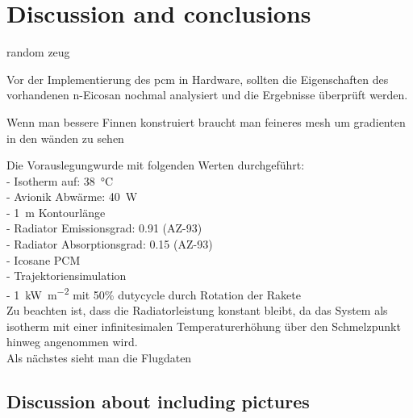 \chapter{Discussion and conclusions}
\label{chap:conclusion}
random zeug

Vor der Implementierung des \ac{pcm} in Hardware, sollten die Eigenschaften des vorhandenen n-Eicosan nochmal analysiert und die Ergebnisse überprüft werden.

Wenn man bessere Finnen konstruiert braucht man feineres mesh um gradienten in den wänden zu sehen


Die Vorauslegungwurde mit folgenden Werten durchgeführt:\\
- Isotherm auf: \SI{38}{\celsius}\\
- Avionik Abwärme: \SI{40}{W}\\
- \SI{1}{m} Kontourlänge\\
- Radiator Emissionsgrad: \SI{0,91}{} (AZ-93)\\
- Radiator Absorptionsgrad: \SI{0,15}{} (AZ-93)\\
- Icosane PCM\\
- Trajektoriensimulation\\
- \SI{1}{\kilo\watt\per\meter\squared} mit 50\% dutycycle durch Rotation der Rakete\\
Zu beachten ist, dass die Radiatorleistung konstant bleibt, da das System als isotherm mit einer
infinitesimalen Temperaturerhöhung über den Schmelzpunkt hinweg angenommen wird.\\
Als nächstes sieht man die Flugdaten

\section{Discussion about including pictures}
